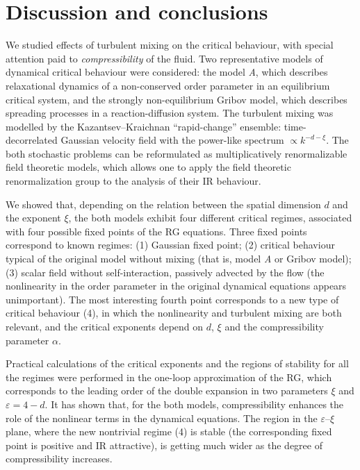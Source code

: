 \documentclass[12pt]{iopart}
\begin{document}
\section{Discussion and conclusions} \label{sec:Conc}


We studied effects of turbulent mixing on the critical behaviour, with
special attention paid to {\it compressibility} of the fluid. Two
representative models of dynamical critical behaviour were considered:
the model {\it A}, which describes relaxational dynamics of a non-conserved
order parameter in an equilibrium critical system, and the strongly
non-equilibrium Gribov model, which describes spreading processes in
a reaction-diffusion system. The turbulent mixing was modelled by the
Kazantsev--Kraichnan ``rapid-change'' ensemble: time-decorrelated Gaussian
velocity field with the power-like spectrum $\propto k^{-d-\xi}$.
The both stochastic problems can be reformulated as multiplicatively
renormalizable field theoretic models, which allows one to apply the field
theoretic renormalization group to the analysis of their IR behaviour.

We showed that, depending on the relation between the spatial dimension
$d$ and the exponent $\xi$, the both models exhibit four different critical
regimes, associated with four possible fixed points of the RG equations.
Three fixed points correspond to known regimes: (1) Gaussian fixed point;
(2) critical behaviour typical of the original model without mixing (that is,
model {\it A} or Gribov model); (3) scalar field without self-interaction,
passively advected by the flow (the nonlinearity in the order parameter in
the original dynamical equations appears unimportant). The most interesting
fourth point corresponds to a new type of critical behaviour (4), in which
the nonlinearity and turbulent mixing are both relevant, and the critical
exponents depend on $d$, $\xi$ and the compressibility parameter $\alpha$.

Practical calculations of the critical exponents and the regions of
stability for all the regimes were performed in the one-loop approximation
of the RG, which corresponds to the leading order of the double expansion
in two parameters $\xi$ and $\varepsilon=4-d$. It has shown that, for the
both models, compressibility enhances the role of the nonlinear terms in
the dynamical equations. The region in the $\varepsilon$--$\xi$ plane,
where the new nontrivial regime (4) is stable (the corresponding fixed
point is positive and IR attractive), is getting much wider as the degree
of compressibility increases. 
\end{document}
